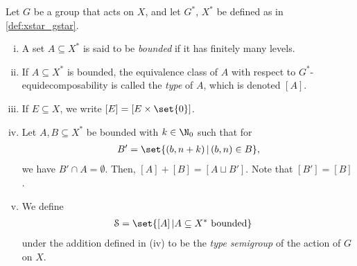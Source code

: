 \documentclass[10pt]{mypackage2}
\begin{document}
\begin{definition}\label{def:type_semigroup}
  Let $G$ be a group that acts on $X$, and let $G^{\ast}$, $X^{\ast}$ be defined as in \ref{def:xstar_gstar}.
  \begin{enumerate}[(i)]
    \item A set $A\subseteq X^{\ast}$ is said to be \textit{bounded} if it has finitely many levels.
    \item If $A\subseteq X^{\ast}$ is bounded, the equivalence class of $A$ with respect to $G^{\ast}$-equidecomposability is called the \textit{type} of $A$, which is denoted $\left[A\right]$.
    \item If $E\subseteq X$, we write $\left[E\right] = \left[E\times \set{0}\right]$.
    \item Let $A,B\subseteq X^{\ast}$ be bounded with $k\in \N_{0}$ such that for
      \begin{align*}
        B'= \set{\left(b,n+k\right)| \left(b,n\right)\in B},
      \end{align*}
      we have $B'\cap A = \emptyset$. Then, $\left[A\right] + \left[B\right] = \left[A\sqcup B'\right]$. Note that $\left[B'\right] = \left[B\right]$.
    \item We define
      \begin{align*}
        \mathcal{S} &= \set{\left[A\right]| A\subseteq X^{\ast}\text{ bounded}}
      \end{align*}
      under the addition defined in (iv) to be the \textit{type semigroup} of the action of $G$ on $X$.
  \end{enumerate}
\end{definition}
\end{document}
